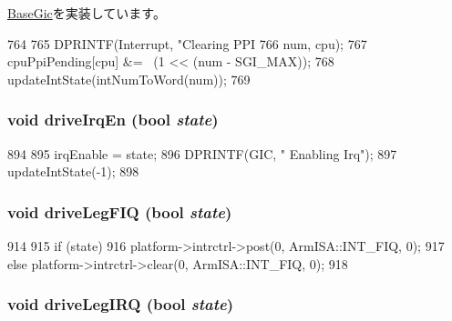 \hyperlink{classBaseGic_ad6b86158511bccf53411efea34fb8b9a}{BaseGic}を実装しています。


\begin{DoxyCode}
764 {
765     DPRINTF(Interrupt, "Clearing PPI %
766             num, cpu);
767     cpuPpiPending[cpu] &= ~(1 << (num - SGI_MAX));
768     updateIntState(intNumToWord(num));
769 }
\end{DoxyCode}
\hypertarget{classPl390_a6bad935267245423d679e5138064ccba}{
\subsubsection[{driveIrqEn}]{\setlength{\rightskip}{0pt plus 5cm}void driveIrqEn (bool {\em state})}}
\label{classPl390_a6bad935267245423d679e5138064ccba}



\begin{DoxyCode}
894 {
895     irqEnable = state;
896     DPRINTF(GIC, " Enabling Irq\n");
897     updateIntState(-1);
898 }
\end{DoxyCode}
\hypertarget{classPl390_a113a9013ccbd1b5de2b9de1955ed009d}{
\subsubsection[{driveLegFIQ}]{\setlength{\rightskip}{0pt plus 5cm}void driveLegFIQ (bool {\em state})}}
\label{classPl390_a113a9013ccbd1b5de2b9de1955ed009d}



\begin{DoxyCode}
914 {
915     if (state)
916         platform->intrctrl->post(0, ArmISA::INT_FIQ, 0);
917     else platform->intrctrl->clear(0, ArmISA::INT_FIQ, 0);
918 }
\end{DoxyCode}
\hypertarget{classPl390_af2be17097e8a42c381ba82762df24562}{
\subsubsection[{driveLegIRQ}]{\setlength{\rightskip}{0pt plus 5cm}void driveLegIRQ (bool {\em state})}}
\label{classPl390_af2be17097e8a42c381ba82762df24562}



